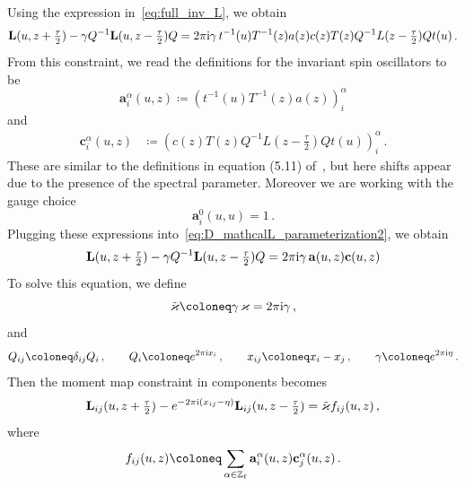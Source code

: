 Using the expression in~\eqref{eq:full_inv_L}, we obtain
\begin{equation}
\label{eq:D_mathcalL_parameterization2}
\mathbf{L}(u,z+\tfrac{\tau}{2}) - \gamma Q^{-1} \mathbf{L}(u,z-\tfrac{\tau}{2}) Q =  2\pi\mathrm{i}\gamma\, t^{-1}(u) T^{-1}(z) a(z) c(z) T(z) Q^{-1} L(z-\tfrac{\tau}{2}) Q t(u) \,.
\end{equation}
From this constraint, we read the definitions for the invariant spin oscillators to be
\begin{equation}
\label{eq:a_inv_spin}
\mathbf{a}_i^\alpha(u,z) \coloneq (t^{-1}(u) T^{-1}(z) a(z))_i^\alpha
\end{equation}
and 
\begin{equation}
\label{eq:b_inv_spin}
\begin{split}
\mathbf{c}_i^\alpha(u,z)&\coloneq (c(z) T(z) Q^{-1} L(z-\tfrac{\tau}{2}) Q t(u))_i^\alpha \,.
\end{split}
\end{equation}
These are similar to the definitions in equation (5.11) of~\cite{arutyunov_hyperbolic_2019}, but here shifts appear due to the presence of the spectral parameter. 
Moreover we are working with the gauge choice
\begin{equation}
\mathbf{a}_i^0(u,u)=1 \,.
\end{equation}
Plugging these expressions into~\eqref{eq:D_mathcalL_parameterization2}, we obtain
\begin{equation}
\mathbf{L}(u,z+\tfrac{\tau}{2}) - \gamma Q^{-1} \mathbf{L}(u, z-\tfrac{\tau}{2}) Q = 2\pi\mathrm{i}\gamma\,  \mathbf{a}(u,z) \mathbf{c}(u,z)
\end{equation}
To solve this equation, we define
\begin{equation}
\label{eq:coupling_redef}
\tilde{\varkappa} \coloneq \gamma \, \varkappa = 2\pi\I\gamma \,,
\end{equation}
and
\begin{equation}
Q_{ij} \coloneq \delta_{ij} Q_i \,, \qquad Q_i \coloneq e^{2\pi\I x_i} \,, \qquad x_{ij} \coloneq x_i - x_j \,, \qquad \gamma \coloneq e^{2\pi\I \eta} \,.
\end{equation}
Then the moment map constraint in components becomes
\begin{equation}
\label{eq:mom_map_constr_L_comp}
\mathbf{L}_{ij}(u,z+\tfrac{\tau}{2}) - e^{-2\pi\mathrm{i} (x_{ij} - \eta)}  \mathbf{L}_{ij}(u, z-\tfrac{\tau}{2}) =  \tilde{\varkappa}  f_{ij}(u,z) \,,
\end{equation}
where
\begin{equation}
f_{ij}(u,z) \coloneq \sum_{\alpha \in \Z_\ell} \mathbf{a}_i^\alpha(u,z) \mathbf{c}_j^\alpha(u,z) \,.
\end{equation}

